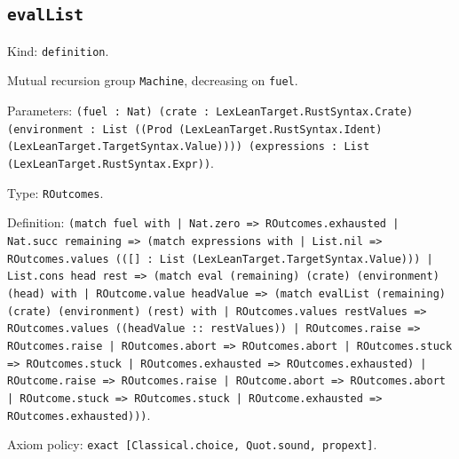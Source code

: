 \documentclass[11pt]{article}
\begin{document}
\subsection*{\texttt{evalList}}
\noindent Kind: \texttt{definition}.\par
\noindent Mutual recursion group \texttt{Machine}, decreasing on \texttt{fuel}.\par
\noindent Parameters: \texttt{(fuel : Nat) (crate : LexLeanTarget.RustSyntax.Crate) (environment : List ((Prod (LexLeanTarget.RustSyntax.Ident) (LexLeanTarget.TargetSyntax.Value)))) (expressions : List (LexLeanTarget.RustSyntax.Expr))}.\par
\noindent Type: \texttt{ROutcomes}.\par
\noindent Definition: \texttt{(match fuel with | Nat.zero => ROutcomes.exhausted | Nat.succ remaining => (match expressions with | List.nil => ROutcomes.values (([] : List (LexLeanTarget.TargetSyntax.Value))) | List.cons head rest => (match eval (remaining) (crate) (environment) (head) with | ROutcome.value headValue => (match evalList (remaining) (crate) (environment) (rest) with | ROutcomes.values restValues => ROutcomes.values ((headValue :: restValues)) | ROutcomes.raise => ROutcomes.raise | ROutcomes.abort => ROutcomes.abort | ROutcomes.stuck => ROutcomes.stuck | ROutcomes.exhausted => ROutcomes.exhausted) | ROutcome.raise => ROutcomes.raise | ROutcome.abort => ROutcomes.abort | ROutcome.stuck => ROutcomes.stuck | ROutcome.exhausted => ROutcomes.exhausted)))}.\par
\noindent Axiom policy: \texttt{exact [Classical.choice, Quot.sound, propext]}.\par
\end{document}
